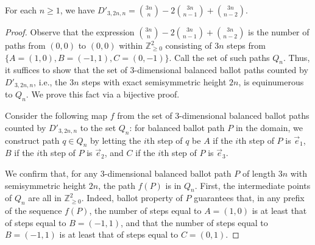 \documentclass[10pt,a4paper]{amsart}
\begin{document}
\begin{proposition}\label{prop:NotTightExample}
    For each $n \geq 1$, we have $D'_{3, 2n, n} = \binom{3n}{n} - 2\binom{3n}{n-1} + \binom{3n}{n-2}$.
\end{proposition}

\begin{proof}
     Observe that the expression $\binom{3n}{n} - 2\binom{3n}{n-1} + \binom{3n}{n-2}$ is the number of paths from $(0, 0)$ to $(0, 0)$ within $\mathbb{Z}_{\geq 0}^2$ consisting of $3n$ steps from $\{A=(1, 0), B= (-1, 1), C=(0, -1)\}$. Call the set of such paths $Q_{n}$. Thus, it suffices to show that the set of $3$-dimensional balanced ballot paths counted by $D'_{3, 2n, n}$, i.e., the $3n$ steps with exact semisymmetric height  $2n$, is equinumerous to $Q_n$. We prove this fact via a bijective proof.

    Consider the following map $f$ from the set  of $3$-dimensional balanced ballot paths counted by $D'_{3, 2n, n}$ to the set $Q_n$: for balanced ballot path $P$ in the domain, we construct path $q \in Q_n$ by letting the $i$th step of $q$ be $A$ if the $i$th step of $P$ is $\vec{e}_1$, $B$ if the $i$th step of $P$ is $\vec{e}_2$, and $C$ if the $i$th step of $P$ is $\vec{e}_3$. 
    
    We confirm that, for any 3-dimensional balanced ballot path $P$ of length $3n$ with semisymmetric height $2n$, the path  $f(P)$ is in $Q_n$. First, the intermediate points of $Q_n$ are all in $\mathbb{Z}_{\geq 0}^2$. Indeed, ballot property of $P$ guarantees that, in any prefix of the sequence $f(P)$, the number of steps equal to $A = (1, 0)$ is at least that of steps equal to $B = (-1, 1)$, and that the number of steps equal to $B = (-1, 1)$ is at least that of steps equal to $C = (0, 1)$.
    

\end{proof}
\end{document}
